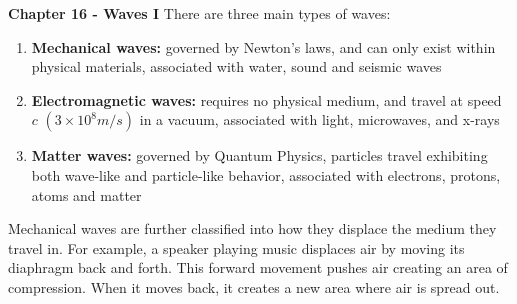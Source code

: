\documentclass[11pt]{article}
\begin{document}
    \noindent \textbf{Chapter 16 - Waves I}
\newline
\newline
    There are three main types of waves:
    \begin{enumerate}
        \item \textbf{Mechanical waves:} governed by Newton's laws, and can only exist
              within physical materials,
              \newline associated with water, sound and seismic waves

        \item \textbf{Electromagnetic waves:} requires no physical medium, and travel at speed $c$  $(3 \times 10^8 m/s)$ in a vacuum,
         associated with light, microwaves, and x-rays
        \item \textbf{Matter waves:} governed by Quantum Physics, particles travel exhibiting both
        wave-like and particle-like behavior, associated with electrons, protons, atoms and matter
    \end{enumerate}

    \noindent Mechanical waves are further classified into how they displace the medium they travel in.
    For example, a speaker playing music displaces air by moving its diaphragm back and forth.
This forward movement pushes air creating an area of compression.
When it moves back, it creates a new area where air is spread out.
\end{document}
